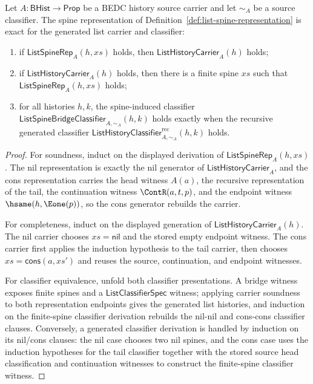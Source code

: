 \begin{theorem}
\label{thm:list-spine-representation-exactness}
Let $A:\mathsf{BHist}\to\mathsf{Prop}$ be a BEDC history source carrier and let $\sim_A$ be a source classifier. The spine representation of Definition~\ref{def:list-spine-representation} is exact for the generated list carrier and classifier:
\begin{enumerate}
  \item if $\mathsf{ListSpineRep}_A(h,xs)$ holds, then $\mathsf{ListHistoryCarrier}_A(h)$ holds;
  \item if $\mathsf{ListHistoryCarrier}_A(h)$ holds, then there is a finite spine $xs$ such that $\mathsf{ListSpineRep}_A(h,xs)$ holds;
  \item for all histories $h,k$, the spine-induced classifier $\mathsf{ListSpineBridgeClassifier}_{A,\sim_A}(h,k)$ holds exactly when the recursive generated classifier $\mathsf{ListHistoryClassifier}^{\mathrm{rec}}_{A,\sim_A}(h,k)$ holds.
\end{enumerate}
\end{theorem}
\begin{proof}
For soundness, induct on the displayed derivation of $\mathsf{ListSpineRep}_A(h,xs)$. The nil representation is exactly the nil generator of $\mathsf{ListHistoryCarrier}_A$, and the cons representation carries the head witness $A(a)$, the recursive representation of the tail, the continuation witness $\ContR(a,t,p)$, and the endpoint witness $\hsame(h,\Eone(p))$, so the cons generator rebuilds the carrier.

For completeness, induct on the displayed generation of $\mathsf{ListHistoryCarrier}_A(h)$. The nil carrier chooses $xs=\mathsf{nil}$ and the stored empty endpoint witness. The cons carrier first applies the induction hypothesis to the tail carrier, then chooses $xs=\mathsf{cons}(a,xs')$ and reuses the source, continuation, and endpoint witnesses.

For classifier equivalence, unfold both classifier presentations. A bridge witness exposes finite spines and a $\mathsf{ListClassifierSpec}$ witness; applying carrier soundness to both representation endpoints gives the generated list histories, and induction on the finite-spine classifier derivation rebuilds the nil-nil and cons-cons classifier clauses. Conversely, a generated classifier derivation is handled by induction on its nil/cons clauses: the nil case chooses two nil spines, and the cons case uses the induction hypotheses for the tail classifier together with the stored source head classification and continuation witnesses to construct the finite-spine classifier witness.
\end{proof}

